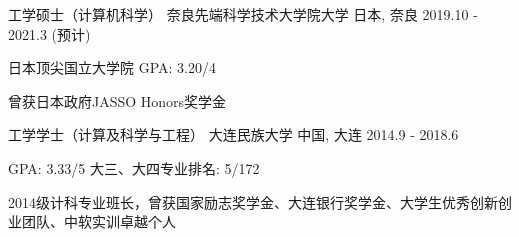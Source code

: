 
\begin{cventries}
 \cventry
    {工学硕士（计算机科学）} %
    {奈良先端科学技术大学院大学} %
    {日本, 奈良} %
    {2019.10 - 2021.3 (预计)} %
    {
      \begin{cvitems}
      \item {日本顶尖国立大学院 \quad GPA: 3.20/4}
      \item {曾获日本政府JASSO Honors奖学金}%
      \end{cvitems}
    }

  \cventry
    {工学学士（计算及科学与工程）} %
    {大连民族大学} %
    {中国, 大连} %
    {2014.9 - 2018.6} %
    {
      \begin{cvitems} %
      \item {GPA: 3.33/5 \quad 大三、大四专业排名: 5/172}
      \item {2014级计科专业班长，曾获国家励志奖学金、大连银行奖学金、大学生优秀创新创业团队、中软实训卓越个人}
      \end{cvitems}
    }

\end{cventries}
